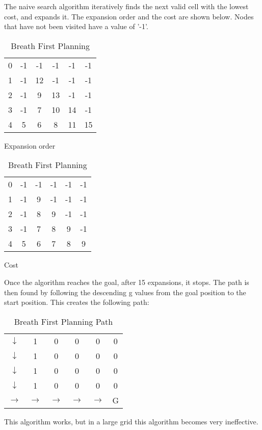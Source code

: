 \documentclass[Main]{subfiles}
\begin{document}
The naive search algorithm iteratively finds the next valid cell with the lowest cost, and expands it. 
The expansion order and the cost are shown below. 
Nodes that have not been visited have a value of '-1'.
\begin{table}[H]
	\begin{subtable}{0.5\linewidth}
		\centering
		\begin{tabular}{cccccc}
			0 & -1 & -1 & -1 & -1 & -1  \\ 
			1 & -1 & 12 & -1 & -1 & -1  \\ 
			2 & -1 &  9 & 13 & -1 & -1  \\ 
			3 & -1 &  7 & 10 & 14 & -1  \\  
			4 &  5 &  6 &  8 & 11 & 15  \\ 
		\end{tabular}
	\caption{Expansion order}
	\label{table:expansion_order} 
	\end{subtable}
	\begin{subtable}{0.5\linewidth}
		\centering
		\begin{tabular}{cccccc}
			0 & -1 & -1 & -1 & -1 & -1  \\ 
			1 & -1 &  9 & -1 & -1 & -1  \\ 
			2 & -1 &  8 &  9 & -1 & -1  \\ 
			3 & -1 &  7 &  8 &  9 & -1  \\  
			4 &  5 &  6 &  7 &  8 &  9  \\ 
		\end{tabular}
	\caption{Cost}
	\label{table:cost_order} 
	\end{subtable}
\caption{Breath First Planning}
\end{table} \noindent
Once the algorithm reaches the goal, after 15 expansions, it stops. 
The path is then found by following the descending g values from the goal position to the start position.
This creates the following path:
\begin{table}[H]
	\centering
	\begin{tabular}{cccccc}
		$\downarrow$ & 1 & 0 & 0 & 0 & 0  \\ 
		$\downarrow$ & 1 & 0 & 0 & 0 & 0  \\ 
		$\downarrow$ & 1 & 0 & 0 & 0 & 0  \\ 
		$\downarrow$ & 1 & 0 & 0 & 0 & 0  \\  
		$\rightarrow$ & $\rightarrow$ & $\rightarrow$ & $\rightarrow$ & $\rightarrow$ & G  \\ 
	\end{tabular}
\caption{Breath First Planning Path}
\label{table:path_map} 
\end{table} \noindent
This algorithm works, but in a large grid this algorithm becomes very ineffective.
\end{document}
